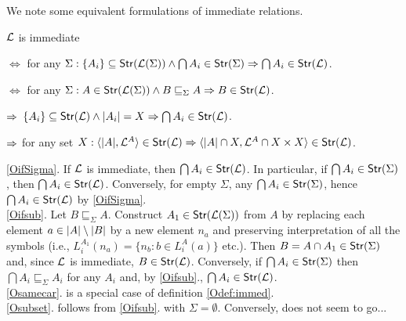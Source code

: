 \documentclass[12pt]{article}
\begin{document}
We note some equivalent formulations of immediate relations.
\begin{Prop}
${{\cal{L}}}$ is immediate 
\begin{enum}
\item\label{OifSigma}$\iff$ 
for any $\Sigma: \{A_i\}\subseteq{\sf {Str}}({{\cal{L}}}(\Sigma)) \land
\bigcap A_i\in{\sf {Str}}(\Sigma) \Rightarrow \bigcap A_i\in{\sf {Str}}({{\cal{L}}})$.
\item\label{Oifsub}$\iff$ 
for  any $\Sigma: A\in{\sf {Str}}({{\cal{L}}}(\Sigma)) \land 
B\sqsubseteq_\Sigma A \Rightarrow B\in {\sf {Str}}({{\cal{L}}})$.
\item\label{Osamecar}$\Rightarrow$ 
$\{A_i\}\subseteq{\sf {Str}}({{\cal{L}}})\land|A_i|=X \Rightarrow \bigcap A_i\in{\sf {Str}}({{\cal{L}}})$.
\item\label{Osubset}$\Rightarrow$ 
for any set $X: \langle|A|,{{\cal{L}}}^A\rangle\in {\sf {Str}}({{\cal{L}}}) \Rightarrow \langle|A|\cap X,
{{\cal{L}}}^A\cap X\times X\rangle\in {\sf {Str}}({{\cal{L}}})$.
\end{enum}
\end{Prop}
\begin{Proof} 
\ref{OifSigma}. If ${{\cal{L}}}$ is immediate, then $\bigcap A_i\in{\sf {Str}}({{\cal{L}}})$. In particular, if
$\bigcap A_i\in{\sf {Str}}(\Sigma)$, then $\bigcap A_i\in{\sf {Str}}({{\cal{L}}})$.
Conversely, for empty $\Sigma$, any $\bigcap A_i\in{\sf {Str}}(\Sigma)$,
hence $\bigcap A_i\in{\sf {Str}}({{\cal{L}}})$ by \ref{OifSigma}. \\[1ex]
%
\ref{Oifsub}. 
Let $B\sqsubseteq_\Sigma A$. Construct $A_1\in{\sf {Str}}({{\cal{L}}}(\Sigma))$ from $A$ by
replacing each element $a\in |A|\setminus|B|$ by
a new element $n_a$ and preserving interpretation of all the symbols (i.e.,
$L_i^{A_1}(n_a) = \{n_b: b\in L_i^A(a)\}$ etc.).  Then $B=A\cap A_1\in{\sf {Str}}(\Sigma)$
and, since ${{\cal{L}}}$ is immediate, $B\in{\sf {Str}}({{\cal{L}}})$.
Conversely, if $\bigcap A_i\in{\sf {Str}}(\Sigma)$ then $\bigcap A_i\sqsubseteq_\Sigma
A_i$ for any $A_i$ and, by \ref{Oifsub}., $\bigcap A_i\in {\sf {Str}}({{\cal{L}}})$. \\[1ex]
%
\ref{Osamecar}. is a special case of definition \ref{Odef:immed}.\\[1ex]
%
\ref{Osubset}. follows from \ref{Oifsub}. with $\Sigma=\emptyset$. Conversely,
   does not seem to go...
\end{Proof}
\end{document}

